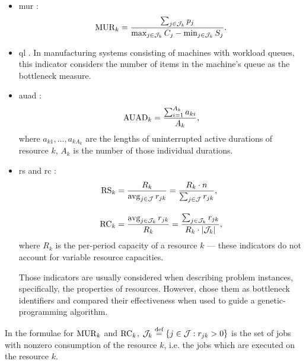 \begin{itemize}
    \item \acf{mur} \citep{Lawrence1994}:
    $$
    \indMUR{k} = \frac{\sum_{j \in \JobsOnResource{k}} \duration{j}}%
                      {\max_{j \in \JobsOnResource{k}} \jobend{j}
                       - \min_{j \in \JobsOnResource{k}} \jobstart{j}}.
    $$

    \item \acf{ql} \citep{Lawrence1994}.
    In manufacturing systems consisting of machines with workload queues,
    this indicator considers the number of items in the machine's queue as the bottleneck measure.
    
    \item \acf{auad} \citep{Roser2001}:
    $$
    \operatorname{AUAD}_{k} = \frac{\sum_{i=1}^{A_k} a_{ki}}{A_k},
    $$
    where $a_{k1}, \dots, a_{kA_k}$ are the lengths of uninterrupted active durations of resource $k$,
    $A_k$ is the number of those individual durations.

    \item \acf{rs} \citep{Cooper1976}
        and \acf{rc} \citep{Patterson1976}:
        \begin{align*}
        \indRS{k} &= \frac{R_{k}}%
                          {\avg_{j \in \Jobs} \consumption{j}{k}}
                  = \frac{R_{k} \cdot n}%
                         {\sum_{j \in \Jobs} \consumption{j}{k}},
        \\[1em]
        \indRC{k} &= \frac{\avg_{j \in \JobsOnResource{k}} \consumption{j}{k}}%
                          {R_{k}}
                   = \frac{\sum_{j \in \JobsOnResource{k}} \consumption{j}{k}}%
                          {R_{k} \cdot |\JobsOnResource{k}|},
        \end{align*}
        where $R_{k}$ is the per-period capacity of a resource $k$
        --- these indicators do not account for variable resource capacities.
        
        Those indicators are usually considered when describing problem instances,
        specifically, the properties of resources.
        However, \citet{Luo2023} chose them as bottleneck identifiers
        and compared their effectiveness when used to guide a genetic-programming algorithm.
\end{itemize}

In the formulae for $\operatorname{MUR}_{k}$ and $\operatorname{RC}_{k}$,
$\mathcal{J}_{k} \overset{\text{def}}{=} \{j \in \mathcal{J} : r_{j k} > 0\}$
is the set of jobs with nonzero consumption of the resource $k$,
i.e. the jobs which are executed on the resource $k$.


